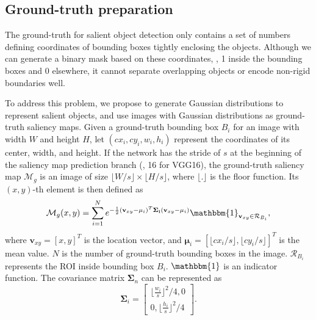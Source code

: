 \documentclass[10pt,twocolumn,letterpaper]{article}
\begin{document}
\subsection{Ground-truth preparation}
The ground-truth for salient object detection only contains a set of numbers defining coordinates of bounding boxes tightly enclosing the objects. Although we can generate a binary mask based on these coordinates, \ie, 1 inside the bounding boxes and 0 elsewhere, it cannot separate overlapping objects or encode non-rigid boundaries well.

To address this problem, we propose to generate Gaussian distributions to represent salient objects, and use images with Gaussian distributions as ground-truth saliency maps. Given a ground-truth bounding box $B_i$ for an image with width $W$ and height $H$, let $(cx_i,cy_i,w_i,h_i)$ represent the coordinates of its center, width, and height.
If the network has the stride of $s$ at the beginning of the saliency map prediction branch (\eg, 16 for VGG16), the ground-truth saliency map $\mathcal{M}_g$ is an image of size $\lfloor W/s \rfloor \times \lfloor H/s\rfloor$, where $\lfloor.\rfloor$ is the floor function. Its $(x,y)$-th element is then defined as
\begin{equation}
\mathcal{M}_g (x,y) = \sum_{i=1}^N e^{-\frac{1}{2}(\mathbf{v}_{xy}-\mathbf{\mu}_i)^T\mathbf{\Sigma_i} (\mathbf{v}_{xy}-\mathbf{\mu}_i)} 
\mathbbm{1}_{\mathbf{v}_{xy} \in \mathcal{R}_{B_i}},
\label{eq:gt}
\end{equation}
%
where $\mathbf{v}_{xy} = [x,y]^T$ is the location vector, and $\mathbf{\mu}_i = [\lfloor cx_i/s \rfloor,\lfloor cy_i/s \rfloor]^T$ is the mean value.
$N$ is the number of ground-truth bounding boxes in the image.
$\mathcal{R}_{B_i}$ represents the ROI inside bounding box $B_i$.
$\mathbbm{1}$ is an indicator function.
The covariance matrix $\mathbf{\Sigma}_n$ can be represented as 
\begin{equation}
\mathbf{\Sigma}_i = \begin{bmatrix}
\lfloor \frac{w_i}{s}\rfloor ^2/4,0\\
0,\lfloor \frac{h_i}{s}\rfloor ^2/4
\end{bmatrix}.
\end{equation}
\end{document}
